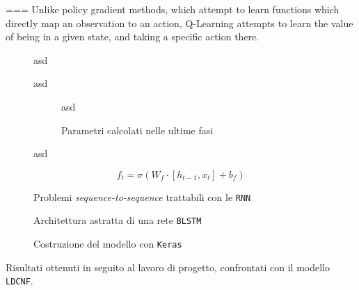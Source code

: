 \documentclass[twoside,twocolumn,10pt]{extarticle}
\theoremstyle{definition}
\begin{document}
	===
	Unlike policy gradient methods, which attempt to learn functions which directly map an observation to an action, Q-Learning attempts to learn the value of being in a given state, and taking a specific action there.

	\begin{figure}[h]
		\centering
		\caption{asd}
		\label{fig:unroll}
	\end{figure}

	\begin{figure}[h]
		\centering
		\caption{asd}
		\label{fig:lstm}
	\end{figure}

	\begin{figure}[h]
		\centering
		\begin{subfigure}[b]{.496\textwidth}
			\caption{asd}
		\end{subfigure}
		\begin{subfigure}[b]{.496\textwidth}
			\caption{Parametri calcolati nelle ultime fasi}
		\end{subfigure}
		\caption{asd}
		\label{fig:parmap}
	\end{figure}
	
	\begin{equation}\label{eq:ft}
		f_t = \sigma(W_f \cdot [h_{t - 1}, x_t] + b_f)
	\end{equation}
	
	\begin{figure}[h]
		\centering
		\caption{Problemi \textit{sequence-to-sequence} trattabili con le \texttt{RNN}}
		\label{fig:seqs}
	\end{figure}
	\begin{figure}
		\centering
		\caption{Architettura astratta di una rete \texttt{BLSTM}}
		\label{fig:blstm}
	\end{figure}
	\begin{figure}[ht!]
		\centering
		\caption{Costruzione del modello con \texttt{Keras}}
		\label{fig:modelcode}
	\end{figure}
	\begin{table}[]
		\centering
		\caption{Risultati ottenuti in seguito al lavoro di progetto, confrontati con il modello \texttt{LDCNF}.}
		\label{tab:results}
		
	\end{table}
	
\end{document}
